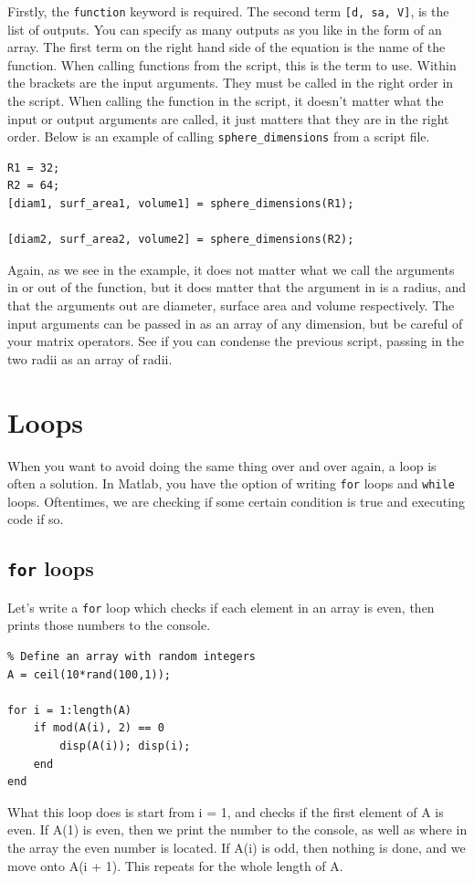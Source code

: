 \documentclass[12pt]{article}
\begin{document}
Firstly, the \texttt{function} keyword is required. The second term \texttt{[d, sa, V]}, is the list of outputs. You can specify as many outputs as you like in the form of an array. The first term on the right hand side of the equation is the name of the function. When calling functions from the script, this is the term to use. Within the brackets are the input arguments. They must be called in the right order in the script. When calling the function in the script, it doesn't matter what the input or output arguments are called, it just matters that they are in the right order. Below is an example of calling \texttt{sphere\_dimensions} from a script file.\\
\begin{lstlisting}
R1 = 32;
R2 = 64;
[diam1, surf_area1, volume1] = sphere_dimensions(R1);

[diam2, surf_area2, volume2] = sphere_dimensions(R2);
\end{lstlisting}

Again, as we see in the example, it does not matter what we call the arguments in or out of the function, but it does matter that the argument in is a radius, and that the arguments out are diameter, surface area and volume respectively. The input arguments can be passed in as an array of any dimension, but be careful of your matrix operators. See if you can condense the previous script, passing in the two radii as an array of radii. 
\newpage
\section{Loops}
When you want to avoid doing the same thing over and over again, a loop is often a solution. In Matlab, you have the option of writing \texttt{for} loops and \texttt{while} loops. Oftentimes, we are checking if some certain condition is true and executing code if so.

\subsection{\texttt{for} loops}
Let's write a \texttt{for} loop which checks if each element in an array is even, then prints those numbers to the console.

\begin{lstlisting}
% Define an array with random integers
A = ceil(10*rand(100,1));

for i = 1:length(A)
	if mod(A(i), 2) == 0
    	disp(A(i)); disp(i);
    end
end
\end{lstlisting}
What this loop does is start from i = 1, and checks if the first element of A is even. If A(1) is even, then we print the number to the console, as well as where in the array the even number is located. If A(i) is odd, then nothing is done, and we move onto A(i + 1). This repeats for the whole length of A. 
\end{document}
